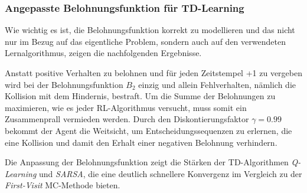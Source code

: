 \par 

\subsubsection*{Angepasste Belohnungsfunktion für TD-Learning}
Wie wichtig es ist, die Belohnungsfunktion korrekt zu modellieren und das nicht nur im Bezug auf das eigentliche Problem, sondern auch auf den verwendeten Lernalgorithmus, zeigen die nachfolgenden Ergebnisse.
\par 
Anstatt positive Verhalten zu belohnen und für jeden Zeitstempel +1 zu vergeben wird bei der Belohnungsfunktion $B_2$ einzig und allein Fehlverhalten, nämlich die Kollision mit dem Hindernis, bestraft. Um die Summe der Belohnungen zu maximieren, wie es jeder RL-Algorithmus versucht, muss somit ein Zusammenprall vermieden werden. Durch den Diskontierungsfaktor $\gamma = 0.99$ bekommt der Agent die \glqq Weitsicht\grqq{}, um Entscheidungssequenzen zu erlernen, die eine Kollision und damit den Erhalt einer negativen Belohnung verhindern. 
\par 
Die Anpassung der Belohnungsfunktion zeigt die Stärken der TD-Algorithmen \textit{Q-Learning} und \textit{SARSA}, die eine deutlich schnellere Konvergenz im Vergleich zu der \textit{First-Visit} MC-Methode bieten.

